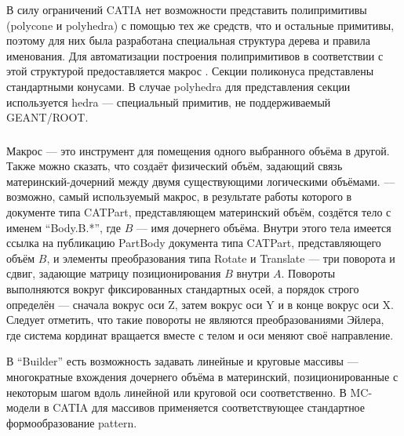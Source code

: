 В силу ограничений CATIA нет возможности представить полипримитивы (polycone и polyhedra) с помощью тех же средств, что и остальные примитивы, поэтому для них была разработана специальная структура дерева и правила именования. Для автоматизации построения полипримитивов в соответствии с этой структурой предоставляется макрос . Секции поликонуса представлены стандартными конусами. В случае polyhedra для представления секции используется hedra --- специальный примитив, не поддерживаемый GEANT/ROOT.


\subsubsection{}\label{sec:secMacroInserter}

Макрос  --- это инструмент для помещения одного выбранного объёма в другой. Также можно сказать, что  создаёт физический объём, задающий связь материнский-дочерний между двумя существующими логическими объёмами.  --- возможно, самый используемый макрос, в результате работы которого в документе типа CATPart, представляющем материнский объём, создётся тело с именем ``Body.B.*'', где $B$ --- имя дочернего объёма. Внутри этого тела имеется ссылка на публикацию PartBody документа типа CATPart, представляющего объём $B$, и элементы преобразования типа Rotate и Translate --- три поворота и сдвиг, задающие матрицу позиционирования $B$ внутри $A$. Повороты выполняются вокруг фиксированных стандартных осей, а порядок строго определён --- сначала вокрус оси Z, затем вокрус оси Y и в конце вокрус оси X. Следует отметить, что такие повороты не являются преобразованиями Эйлера, где система кординат вращается вместе с телом и оси меняют своё направление.

\bigskip


В ``Builder'' есть возможность задавать линейные и круговые массивы --- многократные вхождения дочернего объёма в материнский, позиционированные с некоторым шагом вдоль линейной или круговой оси соответственно. В MC-модели в CATIA для массивов применяется соответствующее стандартное формообразование pattern.

\subsubsection{}\label{sec:secMacroArrayMaker}

